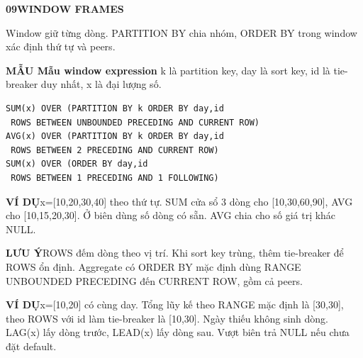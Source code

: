 \documentclass[a4paper]{article}
\newcommand{\bodyfontsize}{5.55}
\newcommand{\bodyleading}{5.2}
\newcommand{\bodylineskiplimit}{-2pt}
\newcommand{\bodystyle}{%
  \fontsize{\bodyfontsize}{\bodyleading}\selectfont\setlength{\lineskiplimit}{\bodylineskiplimit}\RaggedRight
  \setlength{\abovedisplayskip}{.5pt}\setlength{\belowdisplayskip}{.5pt}%
  \setlength{\abovedisplayshortskip}{.3pt}\setlength{\belowdisplayshortskip}{.3pt}}
\newcommand{\topic}[2]{\par\addvspace{.45pt}\nointerlineskip%
  \begingroup\setlength{\fboxsep}{0.35pt}%
  \noindent\colorbox{structure}{\parbox{\dimexpr\linewidth-2\fboxsep\relax}{%
    \color{white}\fontsize{6.45}{6.8}\selectfont\bfseries #1\enspace #2}}%
  \endgroup\par\nobreak\vspace{.55pt}\nointerlineskip\nobreak}
\newenvironment{topicblock}
  {\par\bodystyle}
  {\par}
\newcommand{\key}[1]{\par\textcolor{structure}{\textbf{#1}}\enspace}
\newcommand{\note}[4]{\par\nointerlineskip\vspace{.25pt}\begingroup\setlength{\fboxsep}{0.1pt}%
  \noindent\colorbox{#1}{\parbox{\dimexpr\linewidth-2\fboxsep\relax}{%
    \RaggedRight\textcolor{#2}{\textbf{#3}}\enspace #4}}%
  \endgroup\par\nointerlineskip\vspace{.25pt}}
\newcommand{\trap}[1]{\note{warningbg}{warning}{LƯU Ý}{#1}}
\newcommand{\ex}[1]{\note{examplebg}{example}{VÍ DỤ}{#1}}
\newcommand{\pattern}[1]{\key{MẪU #1}}
\newlength{\sheetwidth}
\newenvironment{sheetcolumns}[1]
  {\noindent\begin{minipage}[t]{#1\sheetwidth}\vspace{0pt}\bodystyle\ignorespaces}
  {\end{minipage}\par}
\begin{document}
\begin{sheetcolumns}{.258}
\begin{topicblock}
\topic{09}{WINDOW FRAMES}
Window giữ từng dòng. PARTITION BY chia nhóm, ORDER BY trong window xác định thứ tự và peers.
\pattern{Mẫu window expression}
k là partition key, day là sort key, id là tie-breaker duy nhất, x là đại lượng số.
\begin{lstlisting}
SUM(x) OVER (PARTITION BY k ORDER BY day,id
 ROWS BETWEEN UNBOUNDED PRECEDING AND CURRENT ROW)
AVG(x) OVER (PARTITION BY k ORDER BY day,id
 ROWS BETWEEN 2 PRECEDING AND CURRENT ROW)
SUM(x) OVER (ORDER BY day,id
 ROWS BETWEEN 1 PRECEDING AND 1 FOLLOWING)
\end{lstlisting}
\ex{x=[10,20,30,40] theo thứ tự. SUM cửa sổ 3 dòng cho [10,30,60,90], AVG cho [10,15,20,30]. Ở biên dùng số dòng có sẵn. AVG chia cho số giá trị khác NULL.}
\trap{ROWS đếm dòng theo vị trí. Khi sort key trùng, thêm tie-breaker để ROWS ổn định. Aggregate có ORDER BY mặc định dùng RANGE UNBOUNDED PRECEDING đến CURRENT ROW, gồm cả peers.}
\ex{x=[10,20] có cùng day. Tổng lũy kế theo RANGE mặc định là [30,30], theo ROWS với id làm tie-breaker là [10,30]. Ngày thiếu không sinh dòng. LAG(x) lấy dòng trước, LEAD(x) lấy dòng sau. Vượt biên trả NULL nếu chưa đặt default.}
\end{topicblock}


\end{sheetcolumns}
\end{document}
